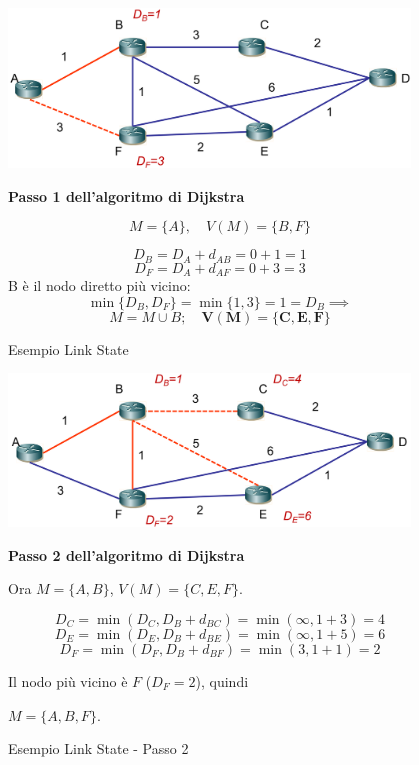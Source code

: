 \begin{figure}[h!]
    \begin{minipage}{0.5\textwidth}
        \centering
        \includegraphics[width=0.95\textwidth]{images/linkstate3.png}
        \caption{Esempio Link State}
        \label{fig:linkstate1}
    \end{minipage}\hfill
    \begin{minipage}{0.49\textwidth}
        \textbf{Passo 1 dell'algoritmo di Dijkstra}

        \[
        M = \{A\}, \quad V(M) = \{B, F\}
        \]

        \[
        D_B = D_A + d_{AB} = 0 + 1 = 1
        \]
        \[
        D_F = D_A + d_{AF} = 0 + 3 = 3
        \]
        B è il nodo diretto più vicino:
        \[
        \min \{ D_B, D_F \} = \min \{ 1, 3 \} = 1 = D_B \implies
        \]
        \[
        M = M \cup B; \quad \mathbf{V(M) = \{C, E, F\}}
        \]
    \end{minipage}
\end{figure}

\begin{figure}[h!]
    \begin{minipage}{0.5\textwidth}
        \centering
        \includegraphics[width=0.95\textwidth]{images/linkstate5.png}
        \caption{Esempio Link State - Passo 2}
        \label{fig:linkstate4}
    \end{minipage}\hfill
    \begin{minipage}{0.49\textwidth}
        \textbf{Passo 2 dell'algoritmo di Dijkstra}

        Ora $M = \{A, B\}$, $V(M) = \{C, E, F\}$.

        \[
        D_C = \min(D_C, D_B + d_{BC}) = \min(\infty, 1 + 3) = 4
        \]
        \[
        D_E = \min(D_E, D_B + d_{BE}) = \min(\infty, 1 + 5) = 6
        \]
        \[
        D_F = \min(D_F, D_B + d_{BF}) = \min(3, 1 + 1) = 2
        \]

        Il nodo più vicino è $F$ ($D_F = 2$), quindi 
        
        $M = \{A, B, F\}$.
    \end{minipage}
\end{figure}

